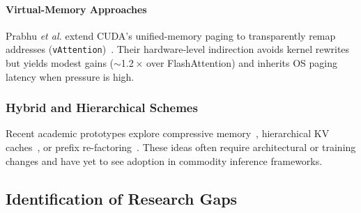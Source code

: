 \documentclass[conference]{IEEEtran}
\begin{document}
\paragraph*{Virtual-Memory Approaches}
Prabhu \textit{et al.} extend CUDA's unified-memory paging to transparently remap addresses (\texttt{vAttention})~\cite{prabhu2024vattention}.  
Their hardware-level indirection avoids kernel rewrites but yields modest gains ($\sim$1.2 × over FlashAttention) and inherits OS paging latency when pressure is high.

\subsubsection{Hybrid and Hierarchical Schemes}
Recent academic prototypes explore compressive memory~\cite{zhang2023infiniattention,chen2024hierkv}, hierarchical KV caches~\cite{karpov2024lazykv}, or prefix re-factoring~\cite{liu2024prefixsharing}.  
These ideas often require architectural or training changes and have yet to see adoption in commodity inference frameworks.

\subsection{Identification of Research Gaps}\label{subsec:gaps}
\end{document}
